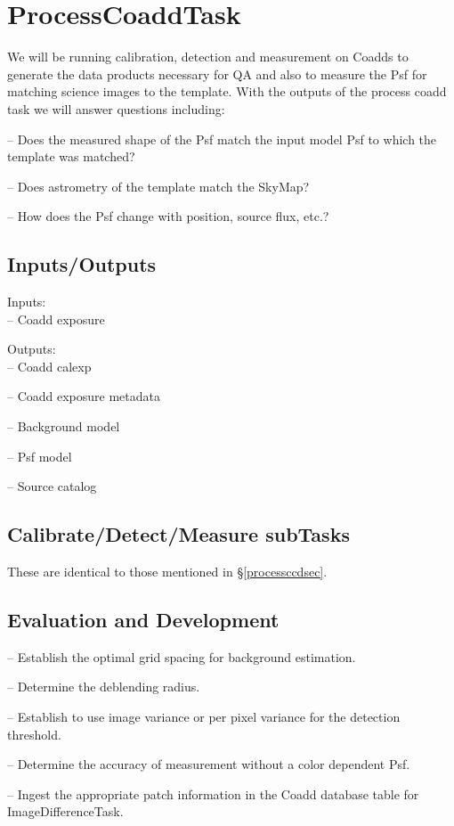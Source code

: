 \documentclass[prd, nofootinbib, floatfix, 11pt,tightenlines,times]{article}
\begin{document}

\section{ProcessCoaddTask} 
We will be running calibration, detection and measurement on Coadds to 
generate the data products necessary for QA and also to measure the Psf
for matching science images to the template.  With the outputs of the process coadd task we will answer questions including:

-- Does the measured shape of the Psf match the input model Psf to which the template was matched?

-- Does astrometry of the template match the SkyMap?

-- How does the Psf change with position, source flux, etc.?

\subsection{Inputs/Outputs}

Inputs: \\
-- Coadd exposure

Outputs:\\
-- Coadd calexp

-- Coadd exposure metadata

-- Background model

-- Psf model

-- Source catalog

\subsection{Calibrate/Detect/Measure subTasks}
These are identical to those mentioned in \S \ref{processccdsec}.

\subsection{Evaluation and Development}

-- Establish the optimal grid spacing for background estimation.

-- Determine the deblending radius.

-- Establish to use image variance or per pixel variance for the detection threshold.

-- Determine the accuracy of measurement without a color dependent Psf.

-- Ingest the appropriate patch information in the Coadd database table for ImageDifferenceTask.
\end{document}
